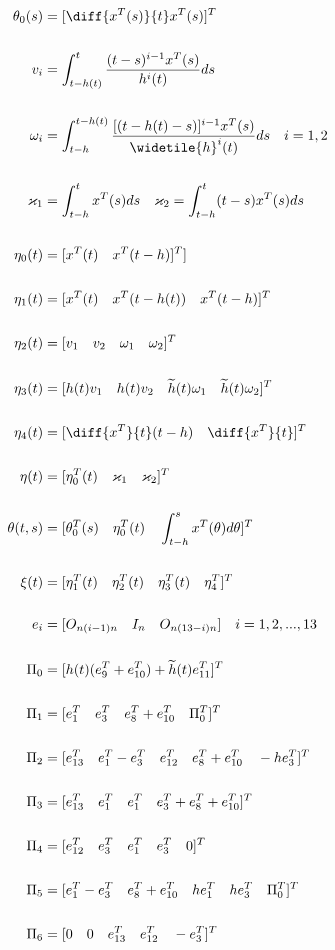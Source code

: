 \documentclass[journal]{IEEEtran}
\begin{document}
 \begin{align}
   \theta _0(s) &= [\diff{x^T(s)}{t} x^T(s)]^T \\ \\
   v_i &= \int ^t _{t-h(t)} \frac{(t-s)^{i-1}x^T(s)}{h^i(t)}ds \\ \\
   \omega _i &= \int ^{t-h(t)} _{t-h} \frac{[(t-h(t)-s)]^{i-1}x^T(s)}{\widetile{h}^i(t)}ds \quad  i= 1,2 \\ \\
   \varkappa _1 &= \int ^t _{t-h} x^T(s)ds \quad \varkappa _2 =\int ^t _{t-h} (t-s)x^T(s)ds \\ \\
   \eta _0(t) &= [x^T(t)\quad x^T(t-h)]^T] \\ \\
   \eta _1(t) &= [x^T(t)\quad x^T(t-h(t)) \quad x^T(t-h)]^T  \\ \\
   \eta _2(t) &= [v_1 \quad v_2 \quad \omega _1 \quad \omega _2]^T \\ \\
   \eta _3(t) &= [h(t)v_1 \quad h(t)v_2 \quad \widetilde{h}(t)\omega _1 \quad \widetilde{h}(t)\omega _2]^T \\ \\
   \eta _4(t) &= [\diff{x^T}{t}(t-h)  \quad \diff{x^T}{t}]^T \\ \\
   \eta (t) &=[\eta _0^T(t) \quad \varkappa _1 \quad \varkappa _2]^T \\ \\
   \theta(t,s)&=[\theta _0^T(s) \quad \eta _0 ^T(t) \quad \int _{t-h}^s x^T(\theta)d\theta]^T \\ \\
   \xi (t) &= [\eta _1^T(t) \quad \eta _2^T(t) \quad  \eta _3^T(t) \quad \eta _4^T]^T \\ \\
   e_i &= [O_{n(i-1)n}\quad I_n \quad O_{n(13-i)n}] \quad i=1,2,...,13 \\ \\
   \Pi_0&=[h(t)(e_9^T +e_{10}^T) +\widetilde{h}(t)e^T_{11} ]^T \\ \\
 \Pi _1 &= [e_1^T \quad e_3^T \quad e_8^T+e_{10}^T \quad \Pi_0^T]^T \\ \\
 \Pi _2 &= [e_{13}^T \quad e_1^T-e_3^T \quad e_{12}^T \quad e_{8}^T+e_{10}^T \quad -he_3^T]^T \\ \\
 \Pi _3 &= [e_{13}^T \quad e_1^T \quad e_{1}^T \quad e_{3}^T+e_{8}^T +e_{10}^T]^T \\ \\
 \Pi _4 &= [e_{12}^T \quad e_3^T \quad e_{1}^T \quad e_{3}^T \quad 0]^T \\ \\
 \Pi _5 &= [e_{1}^T - e_3^T \quad e_{8}^T + e_{10}^T \quad he_{1}^T \quad he_3^T \quad \Pi _0^T]^T \\ \\
 \Pi _6 &= [0 \quad 0 \quad e_{13}^T \quad e_{12}^T \quad -e^T_3]^T \\ \\
 \end{align}
\end{document}
